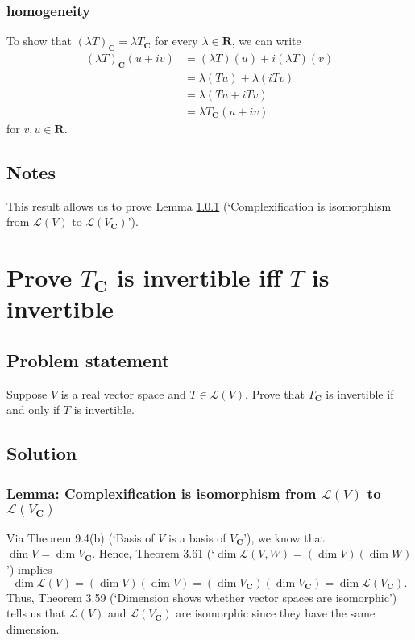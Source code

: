 \documentclass{article}
\begin{document}
\subsubsection*{homogeneity}
To show that $(\lambda T)_{\mathbf{C}}=\lambda T_{\mathbf{C}}$ for every $\lambda\in\mathbf{R}$, we can write
\begin{align*}
    (\lambda T)_{\mathbf{C}}(u+iv)&=(\lambda T)(u)+i(\lambda T)(v)\\
    &=\lambda (Tu)+\lambda(iTv)\\
    &=\lambda(Tu+iTv)\\
    &=\lambda T_{\mathbf{C}}(u+iv)
\end{align*}
for $v,u\in\mathbf{R}$.

\subsection*{Notes}
This result allows us to prove Lemma \ref{lemma:complexification_isomorphic} (`Complexification is isomorphism from $\mathcal{L}(V)$ to $\mathcal{L}(V_{\mathbf{C}})$').

\clearpage

\section{Prove $T_{\mathbf{C}}$ is invertible iff $T$ is invertible}
\subsection*{Problem statement}
Suppose $V$ is a real vector space and $T\in\mathcal{L}(V)$. Prove that $T_{\mathbf{C}}$ is invertible if and only if $T$ is invertible.

\subsection*{Solution}
\subsubsection{Lemma: Complexification is isomorphism from $\mathcal{L}(V)$ to $\mathcal{L}(V_{\mathbf{C}})$}\label{lemma:complexification_isomorphic}
Via Theorem 9.4(b) (`Basis of $V$ is a basis of $V_{\mathbf{C}}$'), we know that $\operatorname{dim}V=\operatorname{dim}V_{\mathbf{C}}$. 
Hence, Theorem 3.61 (`$\operatorname{dim}\mathcal{L}(V,W)=(\operatorname{dim}V)(\operatorname{dim}W)$') implies
\begin{equation*}
    \operatorname{dim}\mathcal{L}(V)=(\operatorname{dim}V)(\operatorname{dim}V)=(\operatorname{dim}V_{\mathbf{C}})(\operatorname{dim}V_{\mathbf{C}})=\operatorname{dim}\mathcal{L}(V_{\mathbf{C}}).
\end{equation*}
Thus, Theorem 3.59 (`Dimension shows whether vector spaces are isomorphic') tells us that $\mathcal{L}(V)$ and $\mathcal{L}(V_{\mathbf{C}})$ are isomorphic since they have the same dimension.
\end{document}
